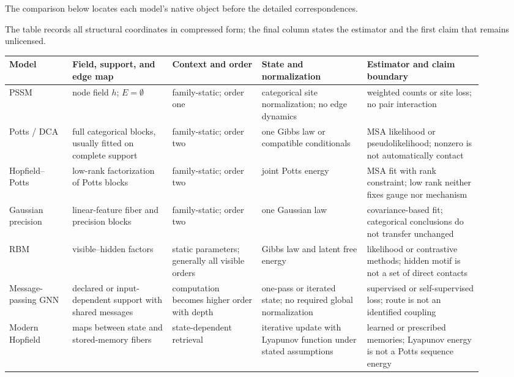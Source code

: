 \documentclass[10pt]{article}
\theoremstyle{definition}
\theoremstyle{remark}
\newcommand{\BookInsert}[1]{}
\begin{document}
\ifdefined\BOOKMODE
The comparison below locates each model's native object before the detailed correspondences.
\BookInsert{chapters/07_model_portraits}
\else
The table records all structural coordinates in compressed form; the final column states the
estimator and the first claim that remains unlicensed.
\begin{center}
\scriptsize
\setlength{\tabcolsep}{3pt}
\begin{tabular}{>{\raggedright\arraybackslash}p{0.12\linewidth}
                >{\raggedright\arraybackslash}p{0.19\linewidth}
                >{\raggedright\arraybackslash}p{0.17\linewidth}
                >{\raggedright\arraybackslash}p{0.20\linewidth}
                >{\raggedright\arraybackslash}p{0.22\linewidth}}
\toprule
Model & Field, support, and edge map & Context and order & State and normalization & Estimator and claim boundary \\
\midrule
PSSM & node field $h$; $E=\emptyset$ & family-static; order one & categorical site normalization; no edge dynamics & weighted counts or site loss; no pair interaction \\
Potts / DCA & full categorical blocks, usually fitted on complete support & family-static; order two & one Gibbs law or compatible conditionals & MSA likelihood or pseudolikelihood; nonzero is not automatically contact \\
Hopfield--Potts & low-rank factorization of Potts blocks & family-static; order two & joint Potts energy & MSA fit with rank constraint; low rank neither fixes gauge nor mechanism \\
Gaussian precision & linear-feature fiber and precision blocks & family-static; order two & one Gaussian law & covariance-based fit; categorical conclusions do not transfer unchanged \\
RBM & visible--hidden factors & static parameters; generally all visible orders & Gibbs law and latent free energy & likelihood or contrastive methods; hidden motif is not a set of direct contacts \\
Message-passing GNN & declared or input-dependent support with shared messages & computation becomes higher order with depth & one-pass or iterated state; no required global normalization & supervised or self-supervised loss; route is not an identified coupling \\
Modern Hopfield & maps between state and stored-memory fibers & state-dependent retrieval & iterative update with Lyapunov function under stated assumptions & learned or prescribed memories; Lyapunov energy is not a Potts sequence energy \\

\end{tabular}
\end{center}
\end{document}
